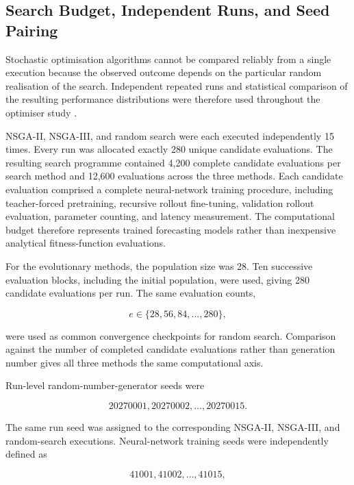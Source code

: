 \documentclass[a4paper,fleqn]{cas-sc}
\begin{document}
\subsection{Search Budget, Independent Runs, and Seed Pairing}
\label{sec:search_budget}

Stochastic optimisation algorithms cannot be compared reliably from a single execution because the observed outcome depends on the particular random realisation of the search. Independent repeated runs and statistical comparison of the resulting performance distributions were therefore used throughout the optimiser study \cite{derrac2011nonparam,latorre2021guidelines}.

NSGA-II, NSGA-III, and random search were each executed independently 15 times. Every run was allocated exactly 280 unique candidate evaluations. The resulting search programme contained 4,200 complete candidate evaluations per search method and 12,600 evaluations across the three methods. Each candidate evaluation comprised a complete neural-network training procedure, including teacher-forced pretraining, recursive rollout fine-tuning, validation rollout evaluation, parameter counting, and latency measurement. The computational budget therefore represents trained forecasting models rather than inexpensive analytical fitness-function evaluations.

For the evolutionary methods, the population size was 28. Ten successive evaluation blocks, including the initial population, were used, giving 280 candidate evaluations per run. The same evaluation counts,

\begin{equation}
e\in\{28,56,84,\ldots,280\},
\end{equation}

were used as common convergence checkpoints for random search. Comparison against the number of completed candidate evaluations rather than generation number gives all three methods the same computational axis.

Run-level random-number-generator seeds were

\begin{equation}
20270001,20270002,\ldots,20270015.
\label{eq:search_rng_seeds}
\end{equation}

The same run seed was assigned to the corresponding NSGA-II, NSGA-III, and random-search executions. Neural-network training seeds were independently defined as

\begin{equation}
41001,41002,\ldots,41015,
\label{eq:candidate_training_seeds}
\end{equation}
\end{document}
